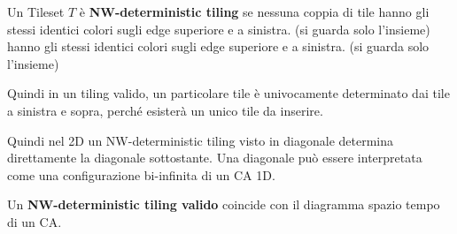 \begin{definizione} 
    Un Tileset $T$ è \textbf{NW-deterministic tiling} se nessuna coppia di tile
    hanno gli stessi identici colori sugli edge superiore e a sinistra. (si guarda solo l'insieme)
    hanno gli stessi identici colori sugli edge superiore e a sinistra. (si guarda solo l'insieme)
\end{definizione}

Quindi in un tiling valido, un particolare tile è univocamente determinato
dai tile a sinistra e sopra, perché esisterà un unico tile da inserire.

Quindi nel 2D un NW-deterministic tiling visto in diagonale determina direttamente
la diagonale sottostante. Una diagonale può essere interpretata come una configurazione
bi-infinita di un CA 1D.

\begin{nota}
    Un \textbf{NW-deterministic tiling valido} coincide con il diagramma spazio
    tempo di un CA.
\end{nota}

